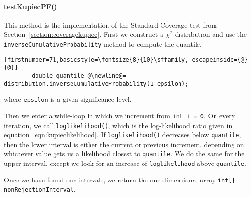 \documentclass[../Dissertation.tex]{subfiles}
\begin{document}
\paragraph{testKupiecPF()}

This method is the implementation of the Standard Coverage test from Section~\ref{section:coveragekupiec}.
First we construct a $\chi^2$ distribution and use the \lstinline|inverseCumulativeProbability| method to compute the quantile.
\begin{lstlisting}[firstnumber=71,basicstyle=\fontsize{8}{10}\sffamily, escapeinside={@}{@}]
        double quantile @\newline@= distribution.inverseCumulativeProbability(1-epsilon);
\end{lstlisting}
where \lstinline|epsilon| is a given significance level.

Then we enter a while-loop in which we increment from \lstinline|int i = 0|.
On every iteration, we call \lstinline|loglikelihood()|, which is the log-likelihood ratio given in equation~\ref{eqn:kupieclikelihood}.
If \lstinline|loglikelihood()| decreases below \lstinline|quantile|, then the lower interval is either the current or previous increment, depending on whichever value gets us a likelihood closest to \lstinline|quantile|.
We do the same for the upper interval, except we look for an increase of \lstinline|loglikelihood| above \lstinline|quantile|.

Once we have found our intervals, we return the one-dimensional array \lstinline|int[] nonRejectionInterval|.
\end{document}
